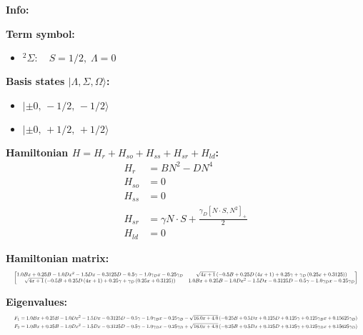 \documentclass[12pt,fleqn]{article}
\begin{document}
\pagestyle{empty}

\textbf{Info:}

\textbf{Term symbol:}
\begin{itemize}
\item $^2\Sigma:\quad S=1/2,\;$
\end{itemize}

\textbf{Basis states $\lvert \Lambda,\Sigma,\Omega\rangle$:}
\begin{itemize}
\item $\lvert {},\,-1/2,\,-1/2\rangle$
\item $\lvert {},\,+1/2,\,+1/2\rangle$
\end{itemize}

\textbf{Hamiltonian $H = H_r + H_{so} + H_{ss} + H_{sr} + H_{ld}$:}
\begin{equation*}
\begin{aligned}
H_r &= B N^{2} - D N^{4} \\
H_{so} &= 0 \\
H_{ss} &= 0 \\
H_{sr} &= \gamma N \cdot S + \frac{\gamma_{D} \left[N \cdot S, N^{2}\right]_+}{2} \\
H_{ld} &= 0
\end{aligned}
\end{equation*}

\textbf{Hamiltonian matrix:}
\begin{equation*}
\resizebox{\linewidth}{!}{$
\left[\begin{matrix}1.0 B x + 0.25 B - 1.0 D x^{2} - 1.5 D x - 0.3125 D - 0.5 \gamma - 1.0 \gamma_{D} x - 0.25 \gamma_{D} & \sqrt{4 x + 1} \left(- 0.5 B + 0.25 D \left(4 x + 1\right) + 0.25 \gamma + \gamma_{D} \left(0.25 x + 0.3125\right)\right)\\\sqrt{4 x + 1} \left(- 0.5 B + 0.25 D \left(4 x + 1\right) + 0.25 \gamma + \gamma_{D} \left(0.25 x + 0.3125\right)\right) & 1.0 B x + 0.25 B - 1.0 D x^{2} - 1.5 D x - 0.3125 D - 0.5 \gamma - 1.0 \gamma_{D} x - 0.25 \gamma_{D}\end{matrix}\right]
$}
\end{equation*}

\textbf{Eigenvalues:}
\begin{equation*}
\resizebox{\linewidth}{!}{$
\begin{aligned}
F_{1} &= 1.0 B x + 0.25 B - 1.0 D x^{2} - 1.5 D x - 0.3125 D - 0.5 \gamma - 1.0 \gamma_{D} x - 0.25 \gamma_{D} - \sqrt{16.0 x + 4.0} \left(- 0.25 B + 0.5 D x + 0.125 D + 0.125 \gamma + 0.125 \gamma_{D} x + 0.15625 \gamma_{D}\right) \\
F_{2} &= 1.0 B x + 0.25 B - 1.0 D x^{2} - 1.5 D x - 0.3125 D - 0.5 \gamma - 1.0 \gamma_{D} x - 0.25 \gamma_{D} + \sqrt{16.0 x + 4.0} \left(- 0.25 B + 0.5 D x + 0.125 D + 0.125 \gamma + 0.125 \gamma_{D} x + 0.15625 \gamma_{D}\right) \\
\end{aligned}
$}
\end{equation*}
\end{document}
